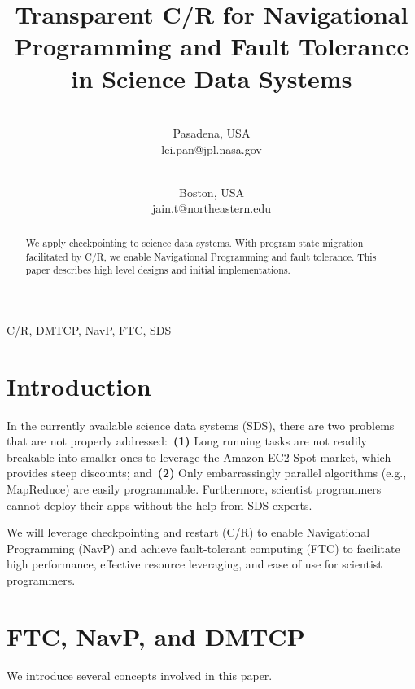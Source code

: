 \documentclass[conference]{IEEEtran}
\begin{document}
\title{Transparent C/R for Navigational Programming and Fault Tolerance in Science Data Systems}


\author{
 \\
Pasadena, USA\\
lei.pan@jpl.nasa.gov\\
\and
{}
 \\
Boston, USA\\
jain.t@northeastern.edu}

\maketitle

\begin{abstract}
We apply checkpointing to science data systems. With program state migration facilitated by C/R, we enable Navigational Programming and fault tolerance. This paper describes high level designs and initial implementations.
\end{abstract}

\begin{IEEEkeywords}
C/R, DMTCP, NavP, FTC, SDS
\end{IEEEkeywords}
\vspace{-2.2mm}
\section{Introduction}
\label{sec:introduction}
In the currently available science data systems (SDS), there are two problems that are not properly addressed:~\textbf{(1)} Long running tasks are not readily breakable into smaller ones to leverage the Amazon EC2 Spot market, which provides steep discounts; and~\textbf{(2)} Only embarrassingly parallel algorithms (e.g., MapReduce) are easily programmable. Furthermore, scientist programmers cannot deploy their apps without the help from SDS experts.

We will leverage checkpointing and restart (C/R) to enable Navigational Programming (NavP) and achieve fault-tolerant computing (FTC) to facilitate high performance, effective resource leveraging, and ease of use for scientist programmers.

\section{FTC, NavP, and DMTCP}
\label{sec:s1}
We introduce several concepts involved in this paper.
\end{document}
